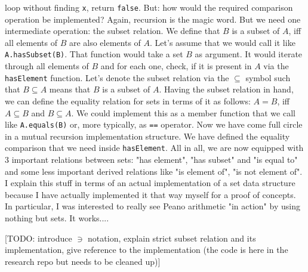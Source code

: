 loop without finding \verb|x|, return \verb|false|. But: how would the required comparison operation be implemented? Again, recursion is the magic word. But we need one intermediate operation: the subset relation. We define that $B$ is a subset of $A$, iff all elements of $B$ are also elements of $A$. Let's assume that we would call it like \verb|A.hasSubset(B)|. That function would take a set $B$ as argument. It would iterate through all elements of $B$ and for each one, check, if it is present in $A$ via the \verb|hasElement| function. Let's denote the subset relation via the $\subseteq$ symbol such that $B \subseteq A$ means that $B$ is a subset of $A$. Having the subset relation in hand, we can define the equality relation for sets in terms of it as follows: $A = B$, iff $A \subseteq B$ and $B \subseteq A$. We could implement this as a member function that we call like \verb|A.equals(B)| or, more typically, as \verb|==| operator. Now we have come full circle in a mutual recursion implementation structure. We have defined the equality comparison that we need inside \verb|hasElement|. All in all, we are now equipped with 3 important relations between sets: "has element", "has subset" and "is equal to" and some less important derived relations like "is element of", "is not element of". I explain this stuff in terms of an actual implementation of a set data structure because I have actually implemented it that way myself for a proof of concepts. In particular, I was interested to really see Peano arithmetic "in action" by using nothing but sets. It works....

[TODO: introduce $\ni$ notation, explain strict subset relation and its implementation, give reference to the implementation (the code is here in the research repo but needs to be cleaned up)]



